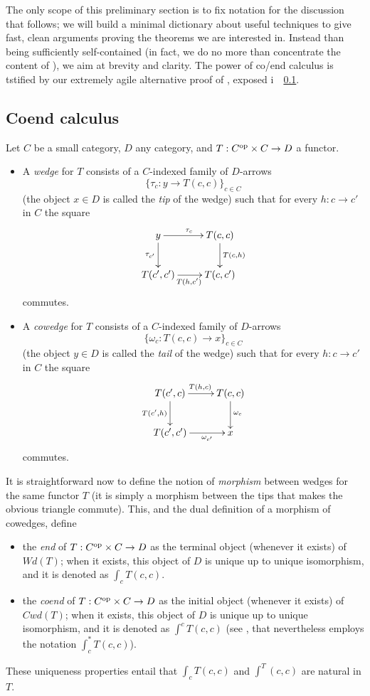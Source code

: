 The only scope of this preliminary section is to fix notation for the
discussion that follows; we will build a minimal dictionary about useful
techniques to give fast, clean arguments proving the theorems we are interested
in. Instead than being sufficiently self-contained (in fact, we do no more than
concentrate the content of \cite[§1,2]{cofriend}), we aim at brevity and
clarity. The power of co/end calculus is tstified by our extremely agile
alternative proof of \cite[???]{adamek2002classification}, exposed i~~\ref{}.
\subsection{Coend calculus}
\begin{definition}[co/wedges]
Let $C$ be a small category, $D$ any category, and $T : C^{\text{op}}\times C \to D$ a functor.
\begin{itemize}
\item A \emph{wedge} for $T$ consists of a $C$-indexed family of $D$-arrows
\[
\{\tau_c : y\to T(c,c)\}_{c\in C}
\]
(the object $x\in D$ is called the \emph{tip} of the wedge) such that for every $h : c\to c'$ in $C$ the square
\[\xymatrix{y \ar[r]^{\tau_c}\ar[d]_{\tau_{c'}}& T(c,c) \ar[d]^{T(c,h)}\\T(c',c') \ar[r]_{T(h,c')}& T(c,c')}\]
commutes.
\item A \emph{cowedge} for $T$ consists of a $C$-indexed family of $D$-arrows
\[
\{\omega_c : T(c,c)\to x\}_{c\in C}
\]
(the object $y\in D$ is called the \emph{tail} of the wedge) such that for every $h : c\to c'$ in $C$ the square
\[\xymatrix{T(c',c) \ar[r]^{T(h,c)}\ar[d]_{T(c',h)}& T(c,c)\ar[d]^{\omega_c}\\ T(c',c')\ar[r]_-{\omega_{c'}} & x}\]
commutes.
\end{itemize}
\end{definition}
\begin{definition}
It is straightforward now to define the notion of \emph{morphism} between wedges for the same functor $T$ (it is simply a morphism between the tips that makes the obvious triangle commute). This, and the dual definition of a morphism of cowedges, define
\begin{itemize}
\item the \emph{end} of $T :C^{\text{op}}\times C \to D$ as the terminal object (whenever it exists) of $Wd(T)$; when it exists, this object of $D$ is unique up to unique isomorphism, and it is denoted as $\int_c T(c,c)$.
\item the \emph{coend} of $T :C^{\text{op}}\times C \to D$ as the initial object (whenever it exists) of $Cwd(T)$; when it exists, this object of $D$ is unique up to unique isomorphism, and it is denoted as $\int^c T(c,c)$ (see \cite{yoneda}, that nevertheless employs the notation $\int_c^* T(c,c)$).
\end{itemize}
These uniqueness properties entail that $\int_c T(c,c)$ and $\int^T(c,c)$ are natural in $T$.
\end{definition}

